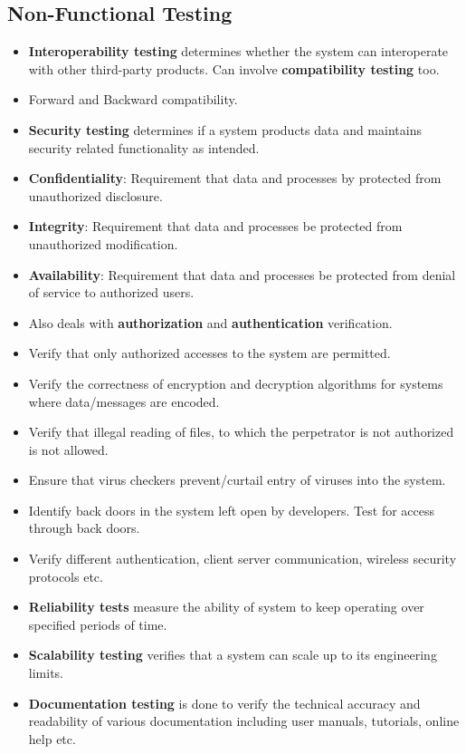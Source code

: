 \documentclass[a4paper]{article}
\begin{document}
\subsection{Non-Functional Testing}
\begin{itemize}
    \item \textbf{Interoperability testing} determines whether the system can interoperate with other third-party products. Can involve \textbf{compatibility testing} too.
    \item Forward and Backward compatibility.
    \item \textbf{Security testing} determines if a system products data and maintains security related functionality as intended.
    \item \textbf{Confidentiality}: Requirement that data and processes by protected from unauthorized disclosure.
    \item \textbf{Integrity}: Requirement that data and processes be protected from unauthorized modification.
    \item \textbf{Availability}: Requirement that data and processes be protected from denial of service to authorized users.
    \item Also deals with \textbf{authorization} and \textbf{authentication} verification.
    \item Verify that only authorized accesses to the system are permitted.
    \item Verify the correctness of encryption and decryption algorithms for systems where data/messages are encoded.
    \item Verify that illegal reading of files, to which the perpetrator is not authorized is not allowed.
    \item Ensure that virus checkers prevent/curtail entry of viruses into the system.
    \item Identify back doors in the system left open by developers. Test for access through back doors.
    \item Verify different authentication, client server communication, wireless security protocols etc.
    \item \textbf{Reliability tests} measure the ability of system to keep operating over specified periods of time.
    \item \textbf{Scalability testing} verifies that a system can scale up to its engineering limits.
    \item \textbf{Documentation testing} is done to verify the technical accuracy and readability of various documentation including user manuals, tutorials, online help etc.

\end{itemize}
\end{document}
